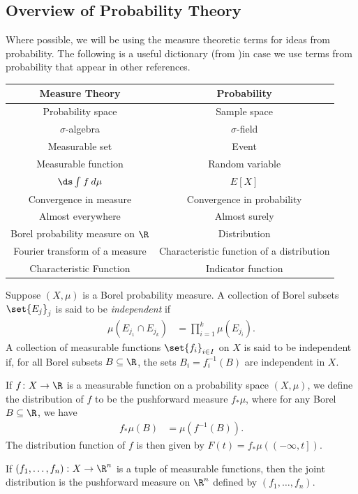 \documentclass[10pt]{mypackage}
\begin{document}
\subsection{Overview of Probability Theory}%
Where possible, we will be using the measure theoretic terms for ideas from probability. The following is a useful dictionary (from \cite[Section 10.1]{folland_real_analysis})in case we use terms from probability that appear in other references.
\begin{center}
  \begin{tabular}{c|c}
    Measure Theory & Probability\\
    \hline
    Probability space & Sample space\\
    $\sigma$-algebra & $\sigma$-field\\
    Measurable set & Event\\
    Measurable function & Random variable\\
    $\ds \int_{}^{} f\:d\mu$ & $ E\left[ X \right] $\\
    Convergence in measure & Convergence in probability\\
    Almost everywhere & Almost surely\\
    Borel probability measure on $\R$ & Distribution\\
    Fourier transform of a measure & Characteristic function of a distribution\\
    Characteristic Function & Indicator function
  \end{tabular}
\end{center}
\begin{definition}
  Suppose $\left( X,\mu \right)$ is a Borel probability measure. A collection of Borel subsets $\set{E_j}_{j}$ is said to be \textit{independent} if
  \begin{align*}
    \mu\left( E_{j_1}\cap E_{j_k} \right) &= \prod_{i=1}^{k} \mu\left( E_{j_i} \right).
  \end{align*}
  A collection of measurable functions $\set{f_i}_{i\in I}$ on $X$ is said to be independent if, for all Borel subsets $B\subseteq \R$, the sets $B_i = f_i^{-1}\left( B \right)$ are independent in $X$.
\end{definition}
\begin{definition}
  If $f\colon X\rightarrow \R$ is a measurable function on a probability space $\left( X,\mu \right)$, we define the distribution of $f$ to be the pushforward measure $f_{\ast}\mu$, where for any Borel $B\subseteq \R$, we have
  \begin{align*}
    f_{\ast}\mu\left( B \right) &= \mu \left( f^{-1}\left( B \right) \right).
  \end{align*}
  The distribution function of $f$ is then given by $F(t) = f_{\ast}\mu\left( \left( -\infty,t \right] \right)$.

  If $\left( f_1,\dots,f_n \right)\colon X\rightarrow \R^{n}$ is a tuple of measurable functions, then the joint distribution is the pushforward measure on $\R^{n}$ defined by $\left( f_1,\dots,f_n \right)$.
\end{definition}
\end{document}
